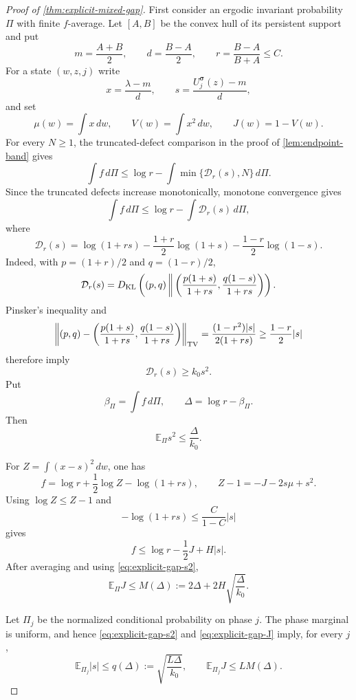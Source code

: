 \documentclass[letterpaper,twoside]{article}
\begin{document}
\begin{proof}[Proof of \cref{thm:explicit-mixed-gap}]
First consider an ergodic invariant probability $\Pi$ with
finite $f$-average.  Let $[A,B]$ be the convex hull of its persistent
support and put
\[
 m=\frac{A+B}{2},\qquad d=\frac{B-A}{2},\qquad
 r=\frac{B-A}{B+A}\le C.
\]
For a state $(w,z,j)$ write
\[
 x=\frac{\lambda-m}{d},\qquad
 s=\frac{U_j^{\bm\sigma}(z)-m}{d},
\]
and set
\[
 \mu(w)=\int x\,dw,\qquad
 V(w)=\int x^2\,dw,\qquad
 J(w)=1-V(w).
\]
For every $N\ge1$, the truncated-defect comparison in the proof of
\cref{lem:endpoint-band} gives
\[
 \int f\,d\Pi
 \le\log r-
 \int\min\{\mathcal D_r(s),N\}\,d\Pi.
\]
Since the truncated defects increase monotonically, monotone convergence
gives
\begin{equation}\label{eq:explicit-gap-endpoint-defect}
 \int f\,d\Pi
 \le\log r-\int\mathcal D_r(s)\,d\Pi,
\end{equation}
where
\[
 \mathcal D_r(s)=\log(1+rs)
 -\frac{1+r}{2}\log(1+s)
 -\frac{1-r}{2}\log(1-s).
\]
Indeed, with $p=(1+r)/2$ and $q=(1-r)/2$,
\[
 \mathcal D_r(s)=D_{\rm KL}\left(
 (p,q)\,\middle\|\,
 \left(\frac{p(1+s)}{1+rs},
       \frac{q(1-s)}{1+rs}\right)\right).
\]
Pinsker's inequality and
\[
 \left\|(p,q)-
 \left(\frac{p(1+s)}{1+rs},
       \frac{q(1-s)}{1+rs}\right)\right\|_{\rm TV}
 =\frac{(1-r^2)|s|}{2(1+rs)}
 \ge\frac{1-r}{2}|s|
\]
therefore imply
\[
 \mathcal D_r(s)\ge k_0s^2.
\]
Put
\[
 \beta_\Pi=\int f\,d\Pi,
 \qquad \Delta=\log r-\beta_\Pi.
\]
Then
\begin{equation}\label{eq:explicit-gap-s2}
 \mathbb E_\Pi s^2\le\frac{\Delta}{k_0}.
\end{equation}

For $Z=\int(x-s)^2\,dw$, one has
\[
 f=\log r+\frac12\log Z-\log(1+rs),
 \qquad Z-1=-J-2s\mu+s^2.
\]
Using $\log Z\le Z-1$ and
\[
 -\log(1+rs)\le\frac{C}{1-C}|s|
\]
gives
\[
 f\le\log r-\frac12J+H|s|.
\]
After averaging and using \eqref{eq:explicit-gap-s2},
\begin{equation}\label{eq:explicit-gap-J}
 \mathbb E_\Pi J
 \le M(\Delta):=
 2\Delta+2H\sqrt{\frac{\Delta}{k_0}}.
\end{equation}

Let $\Pi_j$ be the normalized conditional probability on phase $j$.
The phase marginal is uniform, and hence \eqref{eq:explicit-gap-s2} and
\eqref{eq:explicit-gap-J} imply, for every $j$,
\begin{equation}\label{eq:explicit-gap-phase-bounds}
 \mathbb E_{\Pi_j}|s|
 \le q(\Delta):=\sqrt{\frac{L\Delta}{k_0}},
 \qquad
 \mathbb E_{\Pi_j}J\le LM(\Delta).
\end{equation}


\end{proof}
\end{document}
